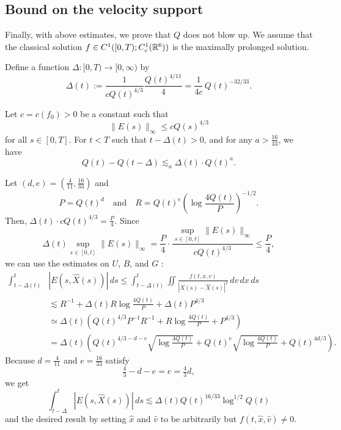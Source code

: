 \documentclass[12pt]{article}
\begin{document}
\subsection{Bound on the velocity support}
Finally, with above estimates, we prove that $Q$ does not blow up.
We assume that the classical solution $f\in C^1([0,T);C_c^1(\mathbb{R}^6))$ is the maximally prolonged solution.
\begin{defn}
Define a function $\Delta:[0,T)\to[0,\infty)$ by
\[\Delta(t):=\frac1{cQ(t)^{4/3}}\frac{Q(t)^{4/11}}4=\frac1{4c}\,Q(t)^{-32/33}.\]
\end{defn}
\begin{cor}
Let $c=c(f_0)>0$ be a constant such that
\[\|E(s)\|_\infty\le cQ(s)^{4/3}\]
for all $s\in[0,T]$.
For $t<T$ such that $t-\Delta(t)>0$, and for any $a>\frac{16}{33}$, we have
\[Q(t)-Q(t-\Delta)\lesssim_a\Delta(t)\cdot Q(t)^a.\]
\end{cor}
\begin{pf}
Let $(d,e)=(\frac4{11},\frac{16}{33})$ and
\[P=Q(t)^d\quad\text{and}\quad R=Q(t)^e(\log\frac{4Q(t)}P)^{-1/2}.\]
Then, $\Delta(t)\cdot cQ(t)^{4/3}=\frac P4$.
Since
\[\Delta(t)\sup_{s\in[0,t]}\|E(s)\|_\infty=\frac P4\cdot\frac{\sup_{s\in[0,t]}\|E(s)\|_\infty}{cQ(t)^{4/3}}\le\frac P4,\]
we can use the estimates on $U$, $B$, and $G$ :
\begin{align*}
\int_{t-\Delta(t)}^t&|E(s,\hat X(s))|\,ds
\le\int_{t-\Delta(t)}^t\iint\frac{f(t,x,v)}{|X(s)-\hat X(s)|^2}\,dv\,dx\,ds\\
&\lesssim R^{-1}+\Delta(t)R\log\frac{4Q(t)}P+\Delta(t)P^{4/3}\\
&\simeq\Delta(t)\left(Q(t)^{4/3}P^{-1}R^{-1}+R\log\frac{4Q(t)}P+P^{4/3}\right)\\
&=\Delta(t)\left(Q(t)^{4/3-d-e}\sqrt{\log\frac{4Q(t)}P}+Q(t)^e\sqrt{\log\frac{4Q(t)}P}+Q(t)^{4d/3}\right).
\end{align*}
Because $d=\frac4{11}$ and $e=\frac{16}{33}$ satisfy
\[\tfrac43-d-e=e=\tfrac43d,\]
we get
\[\int_{t-\Delta}^t|E(s,\hat X(s))|\,ds\lesssim\Delta(t)Q(t)^{16/33}\log^{1/2}Q(t)\]
and the desired result by setting $\hat x$ and $\hat v$ to be arbitrarily but $f(t,\hat x,\hat v)\ne0$.
\end{pf}
\end{document}
